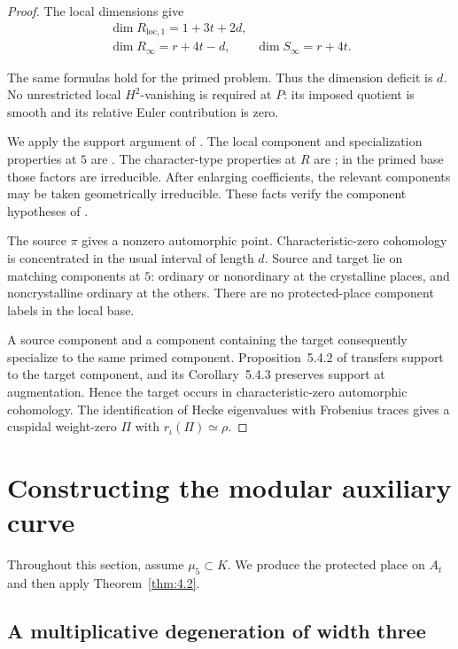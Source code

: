 \documentclass[11pt,a4paper]{article}
\numberwithin{equation}{section}
\begin{document}
\begin{proof}
The local dimensions give
\begin{gather*}
\dim R_{\mathrm{loc},1}=1+3t+2d,\\
\dim R_\infty=r+4t-d,
\qquad \dim S_\infty=r+4t.
\end{gather*}

The same formulas hold for the primed problem. Thus the dimension deficit is \(d\). No unrestricted local \(H^2\)-vanishing is required at \(P\): its imposed quotient is smooth and its relative Euler contribution is zero.

We apply the support argument of \cite[\S5.4]{CN}. The local component and specialization properties at \(5\) are \cite[Proposition~5.3.2 and Lemmas~5.3.3--5.3.4]{CN}. The character-type properties at \(R\) are \cite[Lemma~A.2]{AKT}; in the primed base those factors are irreducible. After enlarging coefficients, the relevant components may be taken geometrically irreducible. These facts verify the component hypotheses of \cite[Assumption~5.4.1]{CN}.

The source \(\pi\) gives a nonzero automorphic point. Characteristic-zero cohomology is concentrated in the usual interval of length \(d\). Source and target lie on matching components at \(5\): ordinary or nonordinary at the crystalline places, and noncrystalline ordinary at the others. There are no protected-place component labels in the local base.

A source component and a component containing the target consequently specialize to the same primed component. Proposition~5.4.2 of \cite{CN} transfers support to the target component, and its Corollary~5.4.3 preserves support at augmentation. Hence the target occurs in characteristic-zero automorphic cohomology. The identification of Hecke eigenvalues with Frobenius traces gives a cuspidal weight-zero \(\Pi\) with \(r_\iota(\Pi)\simeq\rho\).
\end{proof}


\section{Constructing the modular auxiliary curve}
\label{sec:5}

Throughout this section, assume \(\mu_5\subset K\). We produce the protected place on \(A_t\) and then apply Theorem~\ref{thm:4.2}.

\subsection*{A multiplicative degeneration of width three}
\end{document}

